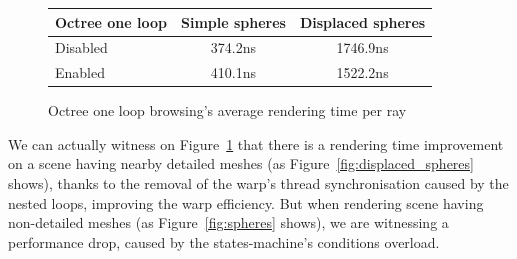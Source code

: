 \begin{figure}[H]
    \tiny
    \centering
    \begin{tabular}{ | l | c | c | }

        \hline
        Octree one loop & Simple spheres & Displaced spheres \\
        \hline
        Disabled & 374.2ns & 1746.9ns \\
        Enabled & 410.1ns & 1522.2ns \\
        \hline

    \end{tabular}
    \caption{Octree one loop browsing's average rendering time per ray}
    \label{table:octree_one_loop_browsing}
\end{figure}

We can actually witness on Figure~\ref{table:octree_one_loop_browsing} that
there is a rendering time improvement on a scene having nearby detailed meshes
(as Figure~\ref{fig:displaced_spheres} shows), thanks to the removal of the warp's thread
synchronisation caused by the nested loops, improving the warp efficiency. But
when rendering scene having non-detailed meshes (as Figure~\ref{fig:spheres} shows), we
are witnessing a performance drop, caused by the states-machine's conditions
overload.
